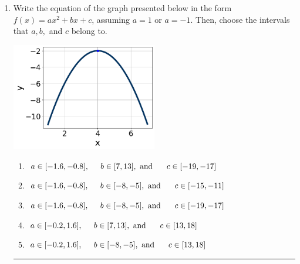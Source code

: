 \documentclass[14pt]{extbook}
\newcommand{\litem}[1]{\item#1\hspace*{-1cm}\rule{\textwidth}{0.4pt}}
\begin{document}
\begin{enumerate}
{\begin{enumerate}[label=\Alph*.]
\end{enumerate} }
\litem{
Write the equation of the graph presented below in the form $f(x)=ax^2+bx+c$, assuming  $a=1$ or $a=-1$. Then, choose the intervals that $a, b,$ and $c$ belong to.
\begin{center}
    \includegraphics[width=0.5\textwidth]{../Figures/quadraticGraphToEquationA.png}
\end{center}
\begin{enumerate}[label=\Alph*.]
\item \( a \in [-1.6, -0.8], \hspace*{5mm} b \in [7, 13], \text{ and } \hspace*{5mm} c \in [-19, -17] \)
\item \( a \in [-1.6, -0.8], \hspace*{5mm} b \in [-8, -5], \text{ and } \hspace*{5mm} c \in [-15, -11] \)
\item \( a \in [-1.6, -0.8], \hspace*{5mm} b \in [-8, -5], \text{ and } \hspace*{5mm} c \in [-19, -17] \)
\item \( a \in [-0.2, 1.6], \hspace*{5mm} b \in [7, 13], \text{ and } \hspace*{5mm} c \in [13, 18] \)
\item \( a \in [-0.2, 1.6], \hspace*{5mm} b \in [-8, -5], \text{ and } \hspace*{5mm} c \in [13, 18] \)


\end{enumerate}}
\end{enumerate}
\end{document}

